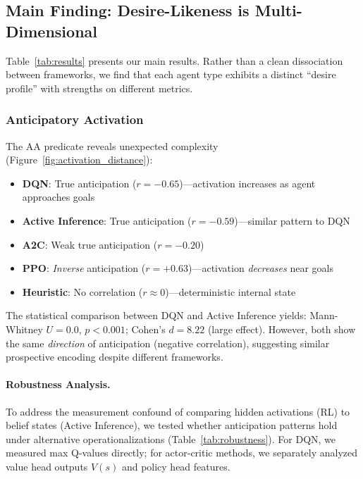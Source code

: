 \documentclass{article}
\begin{document}
\subsection{Main Finding: Desire-Likeness is Multi-Dimensional}



Table~\ref{tab:results} presents our main results. Rather than a clean dissociation between frameworks, we find that each agent type exhibits a distinct ``desire profile'' with strengths on different metrics.

\subsubsection{Anticipatory Activation}

The AA predicate reveals unexpected complexity (Figure~\ref{fig:activation_distance}):

\begin{itemize}
    \item \textbf{DQN}: True anticipation ($r = -0.65$)---activation increases as agent approaches goals
    \item \textbf{Active Inference}: True anticipation ($r = -0.59$)---similar pattern to DQN
    \item \textbf{A2C}: Weak true anticipation ($r = -0.20$)
    \item \textbf{PPO}: \textit{Inverse} anticipation ($r = +0.63$)---activation \textit{decreases} near goals
    \item \textbf{Heuristic}: No correlation ($r \approx 0$)---deterministic internal state
\end{itemize}

The statistical comparison between DQN and Active Inference yields: Mann-Whitney $U = 0.0$, $p < 0.001$; Cohen's $d = 8.22$ (large effect). However, both show the same \textit{direction} of anticipation (negative correlation), suggesting similar prospective encoding despite different frameworks.

\paragraph{Robustness Analysis.} To address the measurement confound of comparing hidden activations (RL) to belief states (Active Inference), we tested whether anticipation patterns hold under alternative operationalizations (Table~\ref{tab:robustness}). For DQN, we measured max Q-values directly; for actor-critic methods, we separately analyzed value head outputs $V(s)$ and policy head features.
\end{document}
